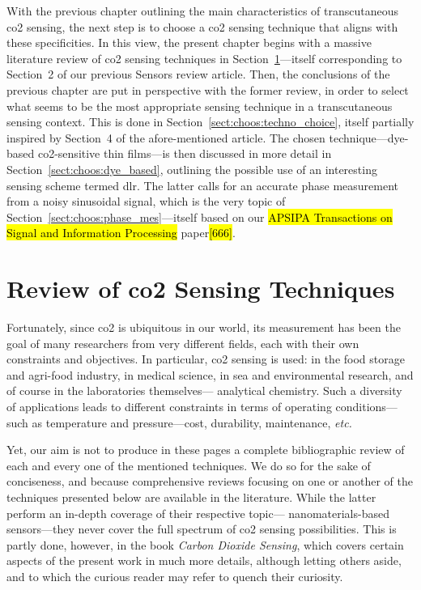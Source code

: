 With the previous chapter outlining the main characteristics of transcutaneous \gls{co2} sensing, the next step is to choose a \gls{co2} sensing technique that aligns with these specificities. In this view, the present chapter begins with a massive literature review of \gls{co2} sensing techniques in Section~\ref{sect:choos:sensors_review}---itself corresponding to Section~2 of our previous Sensors review article\cite{dervieux2022}. Then, the conclusions of the previous chapter are put in perspective with the former review, in order to select what seems to be the most appropriate sensing technique in a transcutaneous sensing context. This is done in Section~\ref{sect:choos:techno_choice}, itself partially inspired by Section~4 of the afore-mentioned article\cite{dervieux2022}. The chosen technique---dye-based \gls{co2}-sensitive thin films---is then discussed in more detail in Section~\ref{sect:choos:dye_based}, outlining the possible use of an interesting sensing scheme termed \gls{dlr}. The latter calls for an accurate phase measurement from a noisy sinusoidal signal, which is the very topic of Section~\ref{sect:choos:phase_mes}---itself based on our \hl{APSIPA Transactions on Signal and Information Processing} paper\hl{[666]}.

\section{Review of \texorpdfstring{\gls{co2}}{CO2} Sensing Techniques}\label{sect:choos:sensors_review}

Fortunately, since \gls{co2} is ubiquitous in our world, its measurement has been the goal of many researchers from very different fields, each with their own constraints and objectives. In particular, \gls{co2} sensing is used: in the food storage and agri-food industry\cite{acock1995}, in medical science\cite{severinghaus1986_3}, in sea and environmental research\cite{shitashima2010}, and of course in the laboratories themselves---\eg{} analytical chemistry. Such a diversity of applications leads to different constraints in terms of operating conditions---such as temperature and pressure---cost, durability, maintenance, \textit{etc.}

Yet, our aim is not to produce in these pages a complete bibliographic review of each and every one of the mentioned techniques. We do so for the sake of conciseness, and because comprehensive reviews focusing on one or another of the techniques presented below are available in the literature\cite{fanget2011, zosel2011, puligundla2012, llobet2013, neethirajan2009, barrington2018, rebber2020, rezk2020, bhowmick2020}. While the latter perform an in-depth coverage of their respective topic---\eg{} nanomaterials-based sensors\cite{llobet2013, rezk2020}---they never cover the full spectrum of \gls{co2} sensing possibilities. This is partly done, however, in the book \emph{Carbon Dioxide Sensing}\cite{decker2019}, which covers certain aspects of the present work in much more details, although letting others aside, and to which the curious reader may refer to quench their curiosity.

